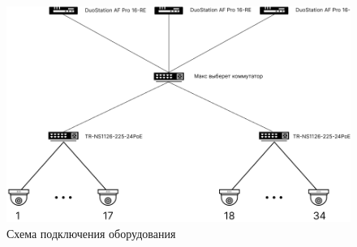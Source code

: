 \begin{figure}[h]
    \begin{center}
        \includegraphics[width=160mm]{images/Схема подключения оборудования}
    \end{center}
    \captionsetup{justification=centering}
    \caption{Схема подключения оборудования}
    \label{fig::connections}
\end{figure}
